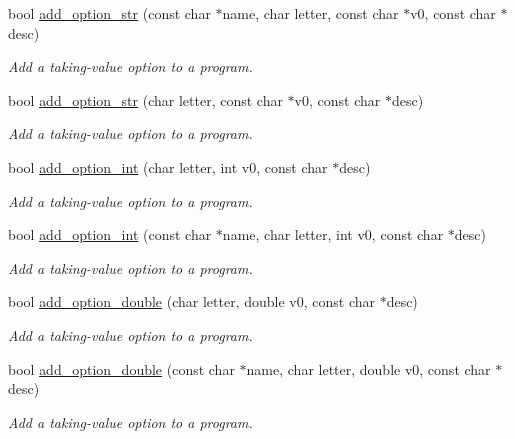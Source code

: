 {\bf }\par
\begin{DoxyCompactItemize}
\item 
bool \hyperlink{class_anyarg_ad97ec66af7ef981b51baa6d16655f3f2}{add\+\_\+option\+\_\+str} (const char $\ast$name, char letter, const char $\ast$v0, const char $\ast$desc)
\begin{DoxyCompactList}\small\item\em Add a taking-\/value option to a program. \end{DoxyCompactList}\item 
bool \hyperlink{class_anyarg_a910a657d64f414ae3a97f1e2c88ff22c}{add\+\_\+option\+\_\+str} (char letter, const char $\ast$v0, const char $\ast$desc)
\begin{DoxyCompactList}\small\item\em Add a taking-\/value option to a program. \end{DoxyCompactList}\item 
bool \hyperlink{class_anyarg_a8bf10dd45f72141ac538bc36d8c90e3e}{add\+\_\+option\+\_\+int} (char letter, int v0, const char $\ast$desc)
\begin{DoxyCompactList}\small\item\em Add a taking-\/value option to a program. \end{DoxyCompactList}\item 
bool \hyperlink{class_anyarg_ad4202a063412042e9bcde266b78df741}{add\+\_\+option\+\_\+int} (const char $\ast$name, char letter, int v0, const char $\ast$desc)
\begin{DoxyCompactList}\small\item\em Add a taking-\/value option to a program. \end{DoxyCompactList}\item 
bool \hyperlink{class_anyarg_a616fa92a586900e277bfc6222428f544}{add\+\_\+option\+\_\+double} (char letter, double v0, const char $\ast$desc)
\begin{DoxyCompactList}\small\item\em Add a taking-\/value option to a program. \end{DoxyCompactList}\item 
bool \hyperlink{class_anyarg_ad5f726956b9525fce547f359bbdcddfc}{add\+\_\+option\+\_\+double} (const char $\ast$name, char letter, double v0, const char $\ast$desc)
\begin{DoxyCompactList}\small\item\em Add a taking-\/value option to a program. \end{DoxyCompactList}\end{DoxyCompactItemize}

